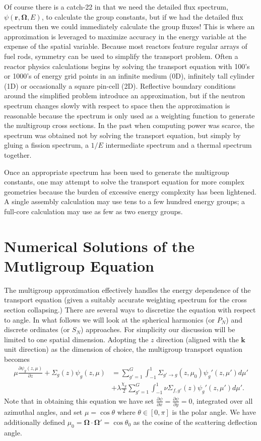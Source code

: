 \documentclass[11pt]{article}
\renewcommand\vec{\mathbf}
\begin{document}
Of course there is a catch-22 in that we need the detailed flux spectrum, \(\psi(\vec{r},\vec{\Omega},E)\), to calculate the group constants, but if we had the detailed flux spectrum then we could immediately calculate the group fluxes!  This is where an approximation is leveraged to maximize accuracy in the energy variable at the expense of the spatial variable.  Because most reactors feature regular arrays of fuel rods, symmetry can be used to simplify the transport problem.  Often a reactor physics calculations begins by solving the transport equation with 100's or 1000's of energy grid points in an infinite medium (0D), infinitely tall cylinder (1D) or occasionally a square pin-cell (2D).  Reflective boundary conditions around the simplified problem introduce an approximation, but if the neutron spectrum changes slowly with respect to space then the approximation is reasonable because the spectrum is only used as a weighting function to generate the multigroup cross sections.  In the past when computing power was scarce, the spectrum was obtained not by solving the transport equation, but simply by gluing a fission spectrum, a \(1/E\) intermediate spectrum and a thermal spectrum together.

Once an appropriate spectrum has been used to generate the multigroup constants, one may attempt to solve the transport equation for more complex geometries because the burden of excessive energy complexity has been lightened.  A single assembly calculation may use tens to a few hundred energy groups; a full-core calculation may use as few as two energy groups.

\section{Numerical Solutions of the Mutligroup Equation}
\label{sec:orgheadline13}
The multigroup approximation effectively handles the energy dependence of the transport equation (given a suitably accurate weighting spectrum for the cross section collapsing.)  There are several ways to discretize the equation with respect to angle.  In what follows we will look at the spherical harmonics (or \(P_N\)) and discrete ordinates (or \(S_N\)) approaches.  For simplicity our discussion will be limited to one spatial dimension.  Adopting the \(z\) direction (aligned with the \(\vec{k}\) unit direction) as the dimension of choice, the multigroup transport equation becomes
\begin{align}
  \mu \frac{\partial \psi_g(z,\mu)}{\partial z}
  + \Sigma_g(z) \psi_g(z,\mu)
  &= \sum_{g'=1}^G \int_{-1}^1 \Sigma_{g'\rightarrow g}(z, \mu_0) \psi_g'(z,\mu') d\mu' \\
  &+ \lambda\frac{\chi_g}{2} \sum_{g'=1}^G \int_{-1}^1 \nu\Sigma_{f,g'}(z) \psi_g'(z,\mu') d\mu'.
  \label{eq::1dMgTransportEqn}
\end{align}
Note that in obtaining this equation we have set \(\frac{\partial \psi}{\partial x} = \frac{\partial \psi}{\partial y} = 0\), integrated over all azimuthal angles, and set \(\mu=\cos\theta\) where \(\theta \in [0,\pi]\) is the polar angle.  We have additionally defined \(\mu_0 = \vec{\Omega}\cdot\vec{\Omega}' = \cos\theta_0\) as the cosine of the scattering deflection angle.
\end{document}
